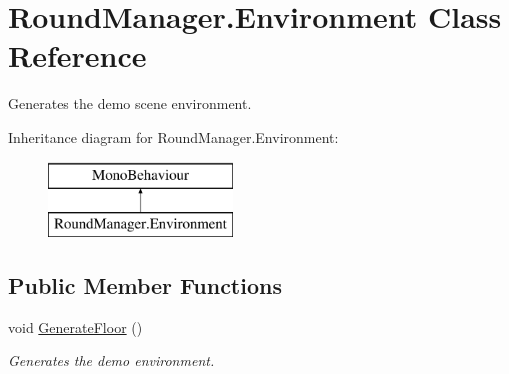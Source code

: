 \hypertarget{class_round_manager_1_1_environment}{}\section{Round\+Manager.\+Environment Class Reference}
\label{class_round_manager_1_1_environment}


Generates the demo scene environment.  


Inheritance diagram for Round\+Manager.\+Environment\+:\begin{figure}[H]
\begin{center}
\leavevmode
\includegraphics[height=2.000000cm]{class_round_manager_1_1_environment}
\end{center}
\end{figure}
\subsection*{Public Member Functions}
\begin{DoxyCompactItemize}
\item 
void \hyperlink{class_round_manager_1_1_environment_a976f982c5c465988cd4b988745d207f3}{Generate\+Floor} ()
\begin{DoxyCompactList}\small\item\em Generates the demo environment. \end{DoxyCompactList}\end{DoxyCompactItemize}

